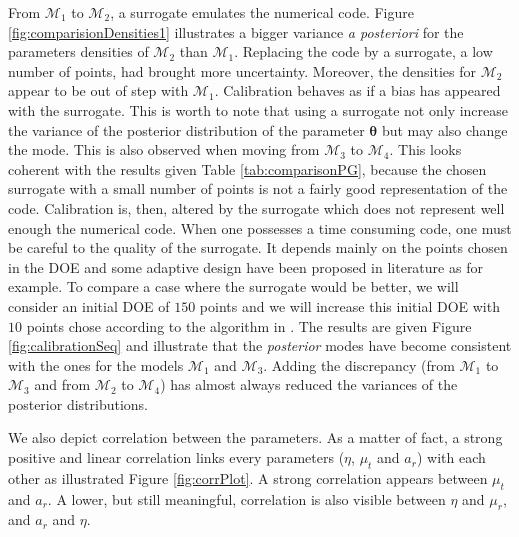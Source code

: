 \documentclass[soumission]{jsfds}
\begin{document}
From $\mathcal{M}_1$ to $\mathcal{M}_2$, a surrogate emulates the numerical code. Figure \ref{fig:comparisionDensities1} illustrates
a bigger variance \textit{a posteriori} for the parameters densities of $\mathcal{M}_2$ than $\mathcal{M}_1$. Replacing the code by
a surrogate, a low number of points, had brought more uncertainty. Moreover, the densities for $\mathcal{M}_2$ appear to be out of step with $\mathcal{M}_1$.
Calibration behaves as if a bias has appeared with the surrogate. This is worth to note that using a surrogate not only increase the variance
of the posterior distribution of the parameter $\boldsymbol{\theta}$ but may also change the mode. This is also observed when moving from
$\mathcal{M}_3$ to $\mathcal{M}_4$. This looks coherent with the results given Table \ref{tab:comparisonPG}, because the chosen surrogate with a small number of points is not a fairly good representation of the code. Calibration is, then, altered by the surrogate which does not represent well enough the numerical code. When one possesses a time consuming code, one must be careful to the quality of the surrogate. It depends mainly on the points chosen in the DOE and some adaptive design have been proposed in literature as \citet{damblin2018} for example. To compare a case where the surrogate would be better, we will consider an initial DOE of $150$ points and we will increase this initial DOE with $10$ points chose according to the algorithm in \citet{damblin2018}. The results are given Figure \ref{fig:calibrationSeq} and illustrate that the \textit{posterior} modes have become consistent with the ones for the models $\mathcal{M}_1$ and $\mathcal{M}_3$.
Adding the discrepancy (from $\mathcal{M}_1$ to $\mathcal{M}_3$ and from $\mathcal{M}_2$ to $\mathcal{M}_4$) has almost always reduced the variances of the posterior distributions.
\newline

We also depict correlation between the parameters. As a matter of fact, a strong positive and linear correlation links every parameters ($\eta$, $\mu_t$ and $a_r$) with each other as illustrated Figure \ref{fig:corrPlot}. A strong correlation appears between $\mu_t$ and $a_r$. A lower, but still meaningful, correlation is also visible between $\eta$ and $\mu_r$, and $a_r$ and $\eta$.\newline
\end{document}
